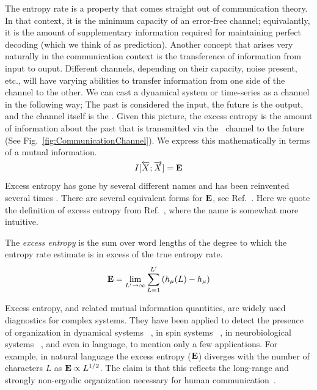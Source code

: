 The entropy rate is a property that comes straight out of communication theory. In that context, it is the minimum capacity of an error-free channel; equivalantly, it is the amount of supplementary information required for maintaining perfect decoding (which we think of as prediction). Another concept that arises very naturally in the communication context is the transference of information from input to ouput. Different channels, depending on their capacity, noise present, etc., will have varying abilities to transfer information from one side of the channel to the other. We can cast a dynamical system or time-series as a channel in the following way; The past is considered the input, the future is the output, and the channel itself is the \eM. Given this picture, the excess entropy is the amount of information about the past that is transmitted via the \eM\ channel to the future (See Fig.~\ref{fig:CommunicationChannel}). We express this mathematically in terms of a mutual information.
\begin{align*}
I[\smash{\overleftarrow {{X}}} ; \smash{\overrightarrow{{X}}}] = {\bf E}
\end{align*}
Excess entropy has gone by several different names and has been reinvented several times . There are several equivalent forms for ${\bf E}$, see Ref.~\cite[and references therein]{Crut01a}. Here we quote the definition of excess entropy from Ref.~, where the name is somewhat more intuitive.
\begin{Def}
The \emph{excess entropy} is the sum over word lengths of the degree to which the entropy rate estimate is in excess of the true entropy rate.
\begin{align*}
{\bf E} = \lim_{L' \to \infty }{\sum_{L=1}^{L'}{(h_\mu(L) - h_\mu})}
\end{align*}
\end{Def}
Excess entropy, and related mutual information quantities, are widely used
diagnostics for complex systems. They have been applied to detect the
presence of organization in dynamical systems~%
\cite{Fras90b,Casd91a,Spro03a,Kant06a}, in spin systems~%
\cite{Arno96,Crut97a,Feld98b}, in neurobiological systems~%
\cite{Tono94a,Bial00a},
and even in language, to mention only a few applications. For example, in
natural language the excess entropy (${\bf E}$) diverges with the number of
characters $L$ as ${\bf E} \propto L^{1/2}$. The claim is that this reflects the
long-range and strongly non-ergodic organization necessary for human
communication~\cite{Ebel94c,Debo08a}.

